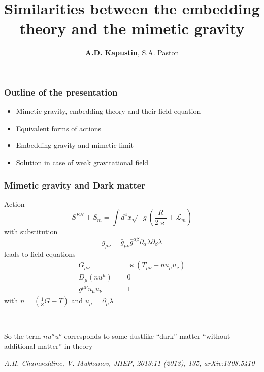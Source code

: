 \documentclass[serif,professionalfonts]{beamer}
\begin{document}
\title[Embedding theory and mimetic gravity]{Similarities between the embedding theory and the mimetic gravity}
\author[\textbf{Kapustin}, Paston]{\textbf{A.D. Kapustin}, S.A. Paston}
\date{}
\maketitle

\begin{frame}
\frametitle{Outline of the presentation}

\begin{itemize}
	\item{Mimetic gravity, embedding theory and their field equation}
	\item{Equivalent forms of actions}
	\item{Embedding gravity and mimetic limit}
	\item{Solution in case of weak gravitational field} 
\end{itemize}
\end{frame}

\begin{frame}
\frametitle{Mimetic gravity and Dark matter}

Action
\begin{equation}
	S^{EH} + S_m= \int d^4x \sqrt{-g}\left( \frac{R}{2 \varkappa} + \mathcal{L}_m \right)
\end{equation}
with substitution
\begin{equation}
	g_{\mu \nu} = \bar{g}_{\mu \nu} \bar{g}^{\alpha \beta} \partial_{\alpha} \lambda \partial_{\beta} \lambda
\end{equation}
leads to field equations
\begin{align}
	G_{\mu \nu} &= \varkappa \left(T_{\mu \nu} + n u_{\mu} u_{\nu} \right) \\
	D_{\mu} (n u^{\mu}) &= 0\\
	g^{\mu \nu} u_{\mu} u_{\nu} &= 1
\end{align}
with $n = \left( \frac{1}{\varkappa} G - T \right)$ and $u_{\mu} = \partial_{\mu} \lambda$

\

So the term $n u^{\mu} u^{\nu}$ corresponds to some dustlike ``dark'' matter ``without additional matter'' in theory

\textit{\small{A.H. Chamseddine, V. Mukhanov, JHEP, 2013:11 (2013), 135, arXiv:1308.5410}}
\end{frame}
\end{document}
